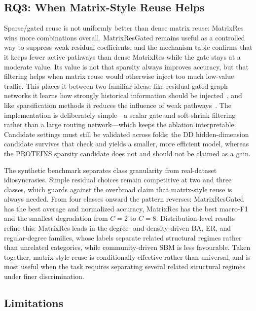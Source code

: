 \subsection{RQ3: When Matrix-Style Reuse Helps}
\label{sec:rq3}

Sparse/gated reuse is not uniformly better than dense matrix reuse: MatrixRes
wins more combinations overall. MatrixResGated remains useful as a controlled
way to suppress weak residual coefficients, and the mechanism table confirms
that it keeps fewer active pathways than dense MatrixRes while the gate stays at
a moderate value. Its value is not that sparsity always improves accuracy, but
that filtering helps when matrix reuse would otherwise inject too much
low-value traffic. This places it between two familiar ideas: like residual
gated graph networks it learns how strongly historical information should be
injected~\cite{bresson2017residual}, and like sparsification methods it reduces
the influence of weak pathways~\cite{rong2019dropedge}. The implementation is
deliberately simple---a scalar gate and soft-shrink filtering rather than a
large routing network---which keeps the ablation interpretable. Candidate
settings must still be validated across folds: the DD hidden-dimension candidate
survives that check and yields a smaller, more efficient model, whereas the
PROTEINS sparsity candidate does not and should not be claimed as a gain.

The synthetic benchmark separates class granularity from real-dataset
idiosyncrasies. Simple residual choices remain competitive at two and three
classes, which guards against the overbroad claim that matrix-style reuse is
always needed. From four classes onward the pattern reverses: MatrixResGated has
the best average and normalized accuracy, MatrixRes has the best macro-F1 and
the smallest degradation from \(C=2\) to \(C=8\). Distribution-level results
refine this: MatrixRes leads in the degree- and density-driven BA, ER, and
regular-degree families, whose labels separate related structural regimes rather
than unrelated categories, while community-driven SBM is less favourable. Taken
together, matrix-style reuse is conditionally effective rather than universal,
and is most useful when the task requires separating several related structural
regimes under finer discrimination.

\subsection{Limitations}
\label{sec:limitations}

